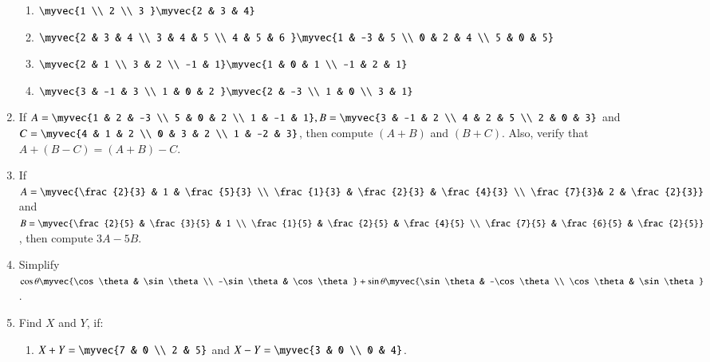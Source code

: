 \documentclass{article}
\theoremstyle{remark}
\begin{document}
\begin{enumerate}
\begin{enumerate}[label=(\roman*)]
\item $\myvec
{1 \\ 2 \\ 3 } \myvec
{2 & 3 & 4}$
\item $\myvec
{2 & 3 & 4 \\ 3 & 4 & 5 \\ 4 & 5 & 6 } \myvec
{1 & -3 & 5 \\ 0 & 2 & 4 \\ 5 & 0 & 5}$
\item  $\myvec
{2 & 1 \\ 3 & 2 \\ -1 & 1}\myvec
{1 & 0 & 1 \\ -1 & 2 & 1}$
\item $\myvec
{3 & -1 & 3 \\ 1 & 0 & 2 } \myvec
{2 & -3 \\ 1 & 0 \\ 3 & 1}$
\end{enumerate}
\item If $A=\myvec
{1 & 2 & -3 \\ 5 & 0 & 2 \\ 1 & -1 & 1}, B=\myvec
{3 & -1 & 2 \\ 4 & 2 & 5 \\ 2 & 0 & 3}$ and $C=\myvec
{4 & 1 & 2 \\ 0 & 3 & 2 \\ 1 & -2 & 3}$, then compute $(A+B)$ and $(B+C)$. Also, verify
that $A+(B-C)=(A+B)-C$.
\item If $A=\myvec
{\frac{2}{3} & 1 & \frac{5}{3} \\ \frac{1}{3} & \frac{2}{3} & \frac{4}{3} \\ \frac{7}{3}& 2 & \frac{2}{3}}$  and $B= \myvec
{\frac{2}{5} & \frac{3}{5} & 1 \\ \frac{1}{5} & \frac{2}{5} & \frac{4}{5} \\ \frac{7}{5} & \frac{6}{5} & \frac{2}{5}}$, then compute $3A-5B$.
\item Simplify $\cos \theta \myvec {\cos \theta & \sin \theta \\ -\sin \theta & \cos \theta} + \sin \theta \myvec{\sin \theta & -\cos \theta \\ \cos \theta & \sin \theta}$.
\item Find $X$ and $Y$, if:
\begin{enumerate}[label=(\roman*)]
\item $X+Y= \myvec
{7 & 0 \\ 2 & 5}$  and $X-Y=\myvec
{3 & 0 \\ 0 & 4}$.

\end{enumerate}
\end{enumerate}
\end{document}
